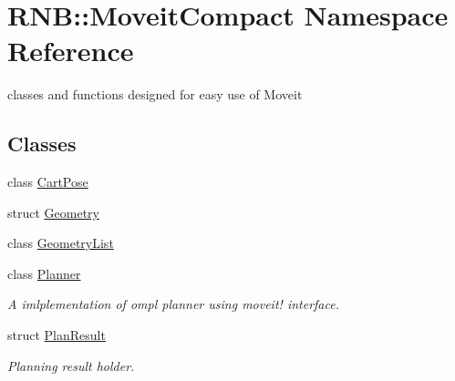 \hypertarget{namespace_r_n_b_1_1_moveit_compact}{}\section{R\+NB\+:\+:Moveit\+Compact Namespace Reference}
\label{namespace_r_n_b_1_1_moveit_compact}


classes and functions designed for easy use of Moveit  


\subsection*{Classes}
\begin{DoxyCompactItemize}
\item 
class \hyperlink{class_r_n_b_1_1_moveit_compact_1_1_cart_pose}{Cart\+Pose}
\item 
struct \hyperlink{struct_r_n_b_1_1_moveit_compact_1_1_geometry}{Geometry}
\item 
class \hyperlink{class_r_n_b_1_1_moveit_compact_1_1_geometry_list}{Geometry\+List}
\item 
class \hyperlink{class_r_n_b_1_1_moveit_compact_1_1_planner}{Planner}
\begin{DoxyCompactList}\small\item\em A imlplementation of ompl planner using moveit! interface. \end{DoxyCompactList}\item 
struct \hyperlink{struct_r_n_b_1_1_moveit_compact_1_1_plan_result}{Plan\+Result}
\begin{DoxyCompactList}\small\item\em Planning result holder. \end{DoxyCompactList}\end{DoxyCompactItemize}
